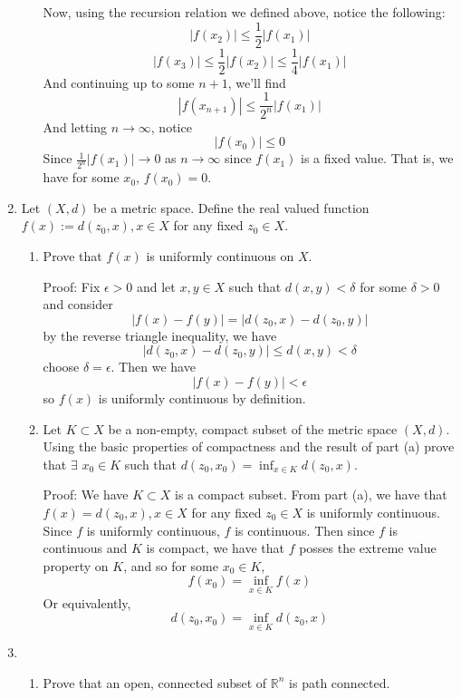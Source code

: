 \documentclass{article}
\begin{document}
\begin{enumerate}
\begin{enumerate}
        Now, using the recursion relation we defined above, notice the following:
        \[|f(x_2)| \leq \frac{1}{2}|f(x_1)|\]
        \[|f(x_3)| \leq \frac{1}{2}|f(x_2)| \leq \frac{1}{4}|f(x_1)|\]
        And continuing up to some $n+1$, we'll find
        \[|f(x_{n+1})| \leq \frac{1}{2^n}|f(x_1)|\]
        And letting $n \to \infty$, notice
        \[|f(x_0)| \leq 0\]
        Since $\frac{1}{2^n}|f(x_1)| \to 0$ as $n \to \infty$ since $f(x_1)$ is a fixed value.
        That is, we have for some $x_0$, $f(x_0) = 0.$
     \end{enumerate}
     
     
     \item Let $(X,d)$ be a metric space. Define the real valued function $f(x) := d(z_0, x), x \in X$ for any fixed $z_0 \in X$.
     \begin{enumerate}
         \item Prove that $f(x)$ is uniformly continuous on $X$.
         
         Proof: Fix $\epsilon > 0$ and let $x, y \in X$ such that $d(x,y) < \delta$ for some $\delta > 0$ and consider 
         \[|f(x) - f(y)| = |d(z_0, x) - d(z_0,y)|\]
         by the reverse triangle inequality, we have
         \[|d(z_0,x) - d(z_0,y)| \leq d(x,y) < \delta\]
         choose $\delta = \epsilon$. Then we have
         \[|f(x) - f(y)| < \epsilon\]
         so $f(x)$ is uniformly continuous by definition.
         
         
         \item Let $K \subset X$ be a non-empty, compact subset of the metric space $(X,d)$. Using the basic properties of compactness and the result of part (a) prove that $\exists$   $x_0 \in K$ such that $d(z_0,x_0) = \inf_{x \in K}d(z_0,x)$.
         
         
         Proof: We have $K \subset X$ is a compact subset. From part (a), we have that $f(x) = d(z_0,x), x \in X$ for any fixed $z_0 \in X$ is uniformly continuous. Since $f$ is uniformly continuous, $f$ is continuous. Then since $f$ is continuous and $K$ is compact, we have that $f$ posses the extreme value property on $K$, and so for some $x_0 \in K$,
         \[f(x_0) = \inf_{x \in K} f(x)\]
         Or equivalently,
         \[d(z_0,x_0) = \inf_{x \in K} d(z_0,x)\]
     \end{enumerate}
     
     \item \begin{enumerate}
         \item Prove that an open, connected subset of $\mathbb{R}^n$ is path connected. 
         

\end{enumerate}
\end{enumerate}
\end{document}
